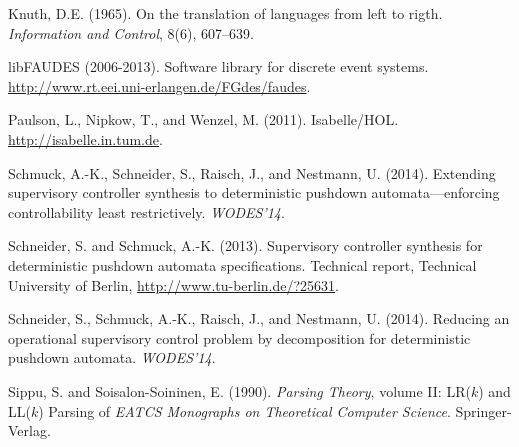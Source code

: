 \documentclass[draft]{ifacconf}
\begin{document}
\begin{thebibliography}{15}
Knuth, D.E. (1965).
\newblock On the translation of languages from left to rigth.
\newblock \emph{Information and Control}, 8(6), 607--639.

libFAUDES (2006-2013).
\newblock Software library for discrete event systems.
\newblock \urlprefix\url{http://www.rt.eei.uni-erlangen.de/FGdes/faudes}.

Paulson, L., Nipkow, T., and Wenzel, M. (2011).
\newblock Isabelle/{HOL}.
\newblock \urlprefix\url{http://isabelle.in.tum.de}.

Schmuck, A.-K., Schneider, S., Raisch, J., and Nestmann, U. (2014).
\newblock Extending supervisory controller synthesis to deterministic pushdown
  automata---enforcing controllability least restrictively.
\newblock \emph{WODES'14}.

Schneider, S. and Schmuck, A.-K. (2013).
\newblock Supervisory controller synthesis for deterministic pushdown automata
  specifications.
\newblock Technical report, Technical University of Berlin, \urlprefix\url{http://www.tu-berlin.de/?25631}.

Schneider, S., Schmuck, A.-K., Raisch, J., and Nestmann, U. (2014).
\newblock Reducing an operational supervisory control problem by decomposition
  for deterministic pushdown automata.
\newblock \emph{WODES'14}.

Sippu, S. and Soisalon-Soininen, E. (1990).
\newblock \emph{Parsing Theory}, volume II: {LR}($k$) and {LL}($k$) Parsing of
  \emph{EATCS Monographs on Theoretical Computer Science}.
\newblock Springer-Verlag.

\end{thebibliography}
 
\end{document}
